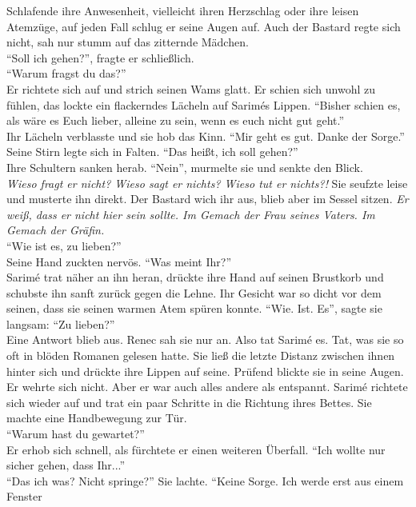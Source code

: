 Schlafende ihre Anwesenheit, vielleicht ihren Herzschlag oder ihre leisen Atemzüge, auf jeden Fall 
schlug er seine Augen auf. Auch der Bastard regte sich nicht, sah nur stumm auf das zitternde 
Mädchen. \\
``Soll ich gehen?'', fragte er schließlich.\\
``Warum fragst du das?''\\
Er richtete sich auf und strich seinen Wams glatt. Er schien sich unwohl zu fühlen, das lockte ein 
flackerndes Lächeln auf Sarimés Lippen. ``Bisher schien es, als wäre es Euch lieber, alleine zu 
sein, wenn es euch nicht gut geht.''\\
Ihr Lächeln verblasste und sie hob das Kinn. ``Mir geht es gut. Danke der Sorge.''\\
Seine Stirn legte sich in Falten. ``Das heißt, ich soll gehen?''\\
Ihre Schultern sanken herab. ``Nein'', murmelte sie und senkte den Blick.\\
\textit{Wieso fragt er nicht? Wieso sagt er nichts? Wieso tut er nichts?!} Sie seufzte leise und 
musterte ihn direkt. Der Bastard wich ihr aus, blieb aber im Sessel sitzen. \textit{Er 
weiß, dass er nicht hier sein sollte. Im Gemach der Frau seines Vaters. Im Gemach der Gräfin.}\\
``Wie ist es, zu lieben?''\\
Seine Hand zuckten nervös. ``Was meint Ihr?''\\
Sarimé trat näher an ihn heran, drückte ihre Hand auf seinen Brustkorb und schubste ihn sanft 
zurück gegen die Lehne. Ihr Gesicht war so dicht vor dem seinen, dass sie seinen warmen Atem spüren 
konnte. ``Wie. Ist. Es'', sagte sie langsam: ``Zu lieben?''\\
Eine Antwort blieb aus. Renec sah sie nur an. Also tat Sarimé es. Tat, was sie so oft in blöden 
Romanen gelesen hatte. Sie ließ die letzte Distanz zwischen ihnen hinter sich und drückte ihre 
Lippen auf seine. Prüfend blickte sie in seine Augen. Er wehrte sich nicht. Aber er war auch alles 
andere als entspannt. Sarimé richtete sich wieder auf und trat ein paar Schritte in die Richtung 
ihres Bettes. Sie machte eine Handbewegung zur Tür. \\
``Warum hast du gewartet?''\\
Er erhob sich schnell, als fürchtete er einen weiteren Überfall. ``Ich wollte nur sicher gehen, 
dass Ihr...'' \\
``Das ich was? Nicht springe?'' Sie lachte. ``Keine Sorge. Ich werde erst aus einem Fenster 
